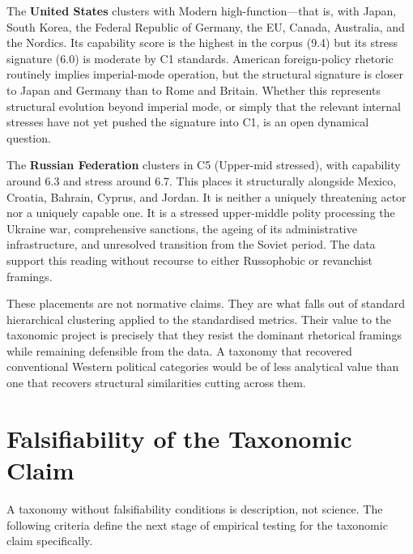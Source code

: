 \documentclass[12pt,a4paper]{article}
\begin{document}
The \textbf{United States} clusters with Modern high-function---that is, with Japan, South Korea, the Federal Republic of Germany, the EU, Canada, Australia, and the Nordics. Its capability score is the highest in the corpus (9.4) but its stress signature (6.0) is moderate by C1 standards. American foreign-policy rhetoric routinely implies imperial-mode operation, but the structural signature is closer to Japan and Germany than to Rome and Britain. Whether this represents structural evolution beyond imperial mode, or simply that the relevant internal stresses have not yet pushed the signature into C1, is an open dynamical question.

The \textbf{Russian Federation} clusters in C5 (Upper-mid stressed), with capability around 6.3 and stress around 6.7. This places it structurally alongside Mexico, Croatia, Bahrain, Cyprus, and Jordan. It is neither a uniquely threatening actor nor a uniquely capable one. It is a stressed upper-middle polity processing the Ukraine war, comprehensive sanctions, the ageing of its administrative infrastructure, and unresolved transition from the Soviet period. The data support this reading without recourse to either Russophobic or revanchist framings.

These placements are not normative claims. They are what falls out of standard hierarchical clustering applied to the standardised metrics. Their value to the taxonomic project is precisely that they resist the dominant rhetorical framings while remaining defensible from the data. A taxonomy that recovered conventional Western political categories would be of less analytical value than one that recovers structural similarities cutting across them.

\section{Falsifiability of the Taxonomic Claim}

A taxonomy without falsifiability conditions is description, not science. The following criteria define the next stage of empirical testing for the taxonomic claim specifically.
\end{document}
